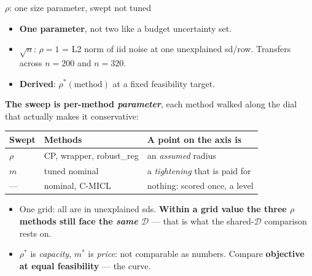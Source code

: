 \documentclass{beamer}
\begin{document}
\begin{frame}{$\rho$: one size parameter, swept not tuned}
  \small
  \begin{itemize}
    \item \textbf{One parameter}, not two like a budget uncertainty set.
    \item $\sqrt n$: $\rho=1$ = L2 norm of iid noise at one
      unexplained sd/row. Transfers across $n{=}200$ and $n{=}320$.
    \item \textbf{Derived}: $\rho^\ast(\text{method})$ at a fixed feasibility target.
  \end{itemize}
  \medskip
  \textbf{The sweep is per-method \emph{parameter}}, each method walked along the
  dial that actually makes it conservative:
  \vspace{-0.3em}
  \begin{center}\footnotesize
  \begin{tabular}{@{}lll@{}}
    \toprule
    Swept & Methods & A point on the axis is \\
    \midrule
    $\rho$ & CP, wrapper, robust\_reg & an \emph{assumed} radius \\
    $m$    & tuned nominal            & a \emph{tightening} that is paid for \\
    ---    & nominal, C-MICL          & nothing: scored once, a level \\
    \bottomrule
  \end{tabular}
  \end{center}
  \vspace{-0.2em}
  \begin{itemize}\footnotesize
    \item One grid: all are in unexplained sds. \textbf{Within a grid value the
      three $\rho$ methods still face the \emph{same} $\mathcal D$} --- that is
      what the shared-$\mathcal D$ comparison rests on.
    \item $\rho^\ast$ is \emph{capacity}, $m^\ast$ is \emph{price}: not comparable
      as numbers. Compare \textbf{objective at equal feasibility} --- the curve.
  \end{itemize}
\end{frame}
\end{document}
